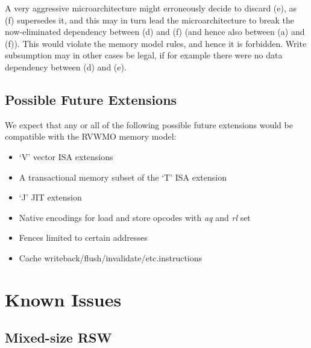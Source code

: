 A very aggressive microarchitecture might erroneously decide to discard (e), as (f) supersedes it, and this may in turn lead the microarchitecture to break the now-eliminated dependency between (d) and (f) (and hence also between (a) and (f)).
This would violate the memory model rules, and hence it is forbidden.
Write subsumption may in other cases be legal, if for example there were no data dependency between (d) and (e).

\subsection{Possible Future Extensions}

We expect that any or all of the following possible future extensions would be compatible with the RVWMO memory model:

\begin{itemize}
  \item `V' vector ISA extensions
  \item A transactional memory subset of the `T' ISA extension
  \item `J' JIT extension
  \item Native encodings for load and store opcodes with {\em aq} and {\em rl} set
  \item Fences limited to certain addresses
  \item Cache writeback/flush/invalidate/etc.\@ instructions
\end{itemize}

\section{Known Issues}
\label{sec:memory:discrepancies}

\subsection{Mixed-size RSW}
\label{sec:memory:discrepancies:mixedrsw}

